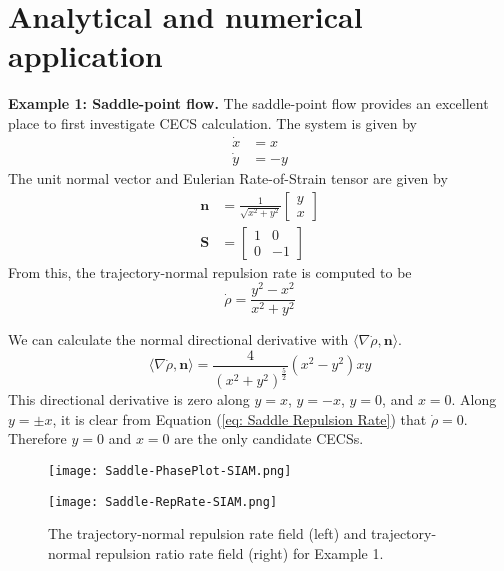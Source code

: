 \documentclass[onecolumn,3p]{elsarticle}
\begin{document}
	\section{Analytical and numerical application}
	
	\noindent \textbf{Example 1: Saddle-point flow.} The saddle-point flow provides an excellent place to first investigate CECS calculation. The system is given by
	\begin{equation}
	\begin{aligned}
	\dot{x} & = x \\
	\dot{y} & = -y
	\end{aligned}
	\end{equation}
	The unit normal vector and Eulerian Rate-of-Strain tensor are given by 
	\begin{equation}
	\begin{aligned}
	\mathbf{n} &= \frac{1}{\sqrt{x^2+y^2}}\left[\begin{array}{c}
	y \\
	x
	\end{array}\right] \\
	\mathbf{S} &= \left[\begin{array}{cc}
	1 & 0 \\
	0 & -1
	\end{array}\right]
	\end{aligned}
	\end{equation}
	From this, the trajectory-normal repulsion rate is computed to be
	\begin{equation}
	\dot{\rho} = \frac{y^2-x^2}{x^2+y^2}
	\label{eq: Saddle Repulsion Rate}
	\end{equation}
	
	We can calculate the normal directional derivative with $\langle \nabla \dot{\rho}, \mathbf{n} \rangle$.
	\begin{equation}
	\langle \nabla \dot{\rho}, \mathbf{n} \rangle = \frac{4}{(x^2+y^2)^{\frac{5}{2}}}\left(x^2-y^2\right)xy
	\end{equation}
	This directional derivative is zero along $y=x$, $y=-x$, $y=0$, and $x=0$. Along $y=\pm x$, it is clear from Equation (\ref{eq: Saddle Repulsion Rate}) that $\dot{\rho}=0$. Therefore $y=0$ and $x=0$ are the only candidate CECSs.
	
	\begin{figure*}[t!]
		\centering
		\begin{minipage}{0.45\textwidth}
			\centering
			\texttt{[image: Saddle-PhasePlot-SIAM.png]}
		\end{minipage}
		\begin{minipage}{0.45\textwidth}
			\centering
			\texttt{[image: Saddle-RepRate-SIAM.png]}
		\end{minipage}
		\caption{The trajectory-normal repulsion rate field (left) and trajectory-normal repulsion ratio rate field (right) for Example 1.}
		\label{fig: saddle}
	\end{figure*}
	
\end{document}
